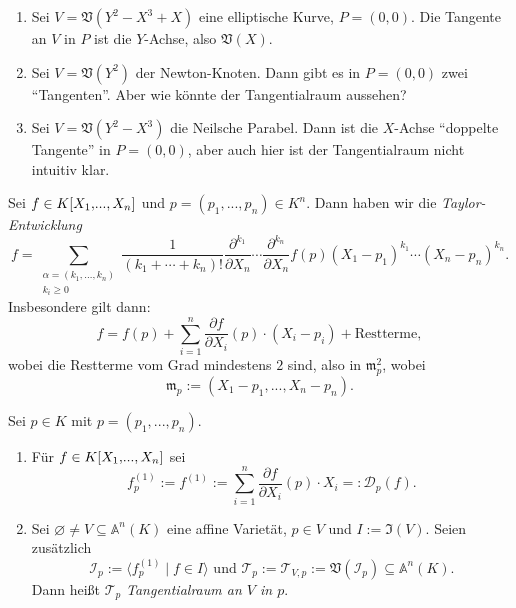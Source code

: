 \documentclass[a4paper,12pt,index=toc]{scrbook}
\theoremstyle{keinenummern} %
\def\A{\mathbb{A}}
\def\V{\mathfrak{V}}
\def\I{\mathfrak{I}}
\def\II{\mathcal{I}}
\newcommand{\DD}{\mathcal{D}} %
\def\T{\mathcal{T}}
\def\m{\mathfrak{m}}
\newcommand{\leer}{\ensuremath{\varnothing}}
\let\olddotsc\dotsc %
\renewcommand{\dotsc}{\ensuremath{\!...}}
\newcommand{\polyx}[1][n]{\ensuremath%
  [X_{1},\dotsc,X_{#1}]}
\begin{document}
\begin{nbsp}
\begin{enumerate}
\item Sei $V=\V(Y^{2}-X^{3}+X)$ eine elliptische Kurve, $P=(0,0)$. Die Tangente an $V$ in $P$ ist die $Y$-Achse, also $\V(X)$.
\item Sei $V=\V(Y^{2})$ der Newton-Knoten. Dann gibt es in $P=(0,0)$ zwei \enquote{Tangenten}. Aber wie könnte der Tangentialraum aussehen?
\item Sei $V=\V(Y^{2}-X^{3})$ die Neilsche Parabel. Dann ist die $X$-Achse \enquote{doppelte Tangente} in $P=(0,0)$, aber auch hier ist der Tangentialraum nicht intuitiv klar.
\end{enumerate}\end{nbsp}

\begin{erinnerung}\label{3.3.1}
Sei $f\in K\polyx$ und $p=(p_{1},\dotsc,p_{n})\in K^{n}$. Dann haben wir die \emph{Taylor-Entwicklung}
\[f=\!\!\!\!\sum_{\substack{\alpha=(k_{1},\olddotsc,k_{n})\\k_{i}\geq 0}}\!\!\frac{1}{(k_{1}+\dotsm+k_{n})!}\frac{\partial^{k_{1}}}{\partial X_{n}}\dotsm\frac{\partial^{k_{n}}}{\partial X_{n}}f(p)(X_{1}-p_{1})^{k_{1}}\dotsm(X_{n}-p_{n})^{k_{n}}.\]
Insbesondere gilt dann:
\[f=f(p)+\sum_{i=1}^{n}\frac{\partial f}{\partial X_{i}}(p)\cdot(X_{i}-p_{i})+\text{Restterme},\]
wobei die Restterme vom Grad mindestens $2$ sind, also in $\m_{p}^{2}$, wobei
\[\m_{p}:=(X_{1}-p_{1},\dotsc,X_{n}-p_{n}).\]
\end{erinnerung}

\begin{dfn}\label{3.3.2}
Sei $p\in K$ mit $p=(p_{1},\dotsc,p_{n})$.
\begin{enumerate}
\item{} Für $f\in K\polyx$ sei
\[f_{p}^{(1)}:=f^{(1)}:=\sum_{i=1}^{n}\frac{\partial f}{\partial X_{i}}(p)\cdot X_{i}=:\DD_{p}(f).\]
\item{} Sei $\leer\neq V\subseteq\A^{n}(K)$ eine affine Varietät, $p\in V$ und $I:=\I(V)$. Seien zusätzlich
\[\II_{p}:=\langle f_{p}^{(1)}\mid f\in I\rangle\text{ und }\T_{p}:=\T_{V,p}:=\V(\II_{p})\subseteq\A^{n}(K).\]
Dann heißt $\T_{p}$ \emph{Tangentialraum an $V$ in $p$}.
\end{enumerate}\end{dfn}
\end{document}
